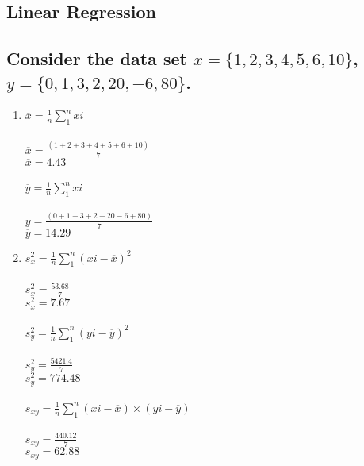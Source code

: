 \documentclass{assignment}
\date{}
\begin{document}
\begin{problem}
\section{Linear Regression}

\subsection{Consider the data set \(x = \{1,2,3,4,5,6,10\}\), \(y = \{0,1,3,2,20,-6,80\}\).}
\begin{enumerate}[label=\alph*)] 
    \item 
    $\overline{x} = \frac{1}{n}\sum^n_1xi$ \\\\
    $\overline{x} = \frac{(1 + 2 + 3 + 4 + 5 + 6 + 10)}{7}$\\
    $\overline{x} = 4.43$\\\\
    
    $\overline{y} = \frac{1}{n}\sum^n_1xi$ \\\\
    $\overline{y} = \frac{(0 + 1 + 3 + 2 + 20 - 6 + 80)}{7}$\\
    $\overline{y} = 14.29$\\


    \item 
    $s^2_x = \frac{1}{n}\sum^n_1(xi-\overline{x})^2$ \\\\
    $s^2_x = \frac{53.68}{7}$\\
    $s^2_x = 7.67$\\\\
    
    $s^2_y = \frac{1}{n}\sum^n_1(yi-\overline{y})^2$ \\\\
    $s^2_y = \frac{5421.4}{7}$\\
    $s^2_y = 774.48$\\\\

    $s_{xy} = \frac{1}{n}\sum^n_1(xi-\overline{x})\times(yi-\overline{y})$\\\\
    $s_{xy} = \frac{440.12}{7}$\\
    $s_{xy} = 62.88$\\\\


\end{enumerate}
\end{problem}
\end{document}
